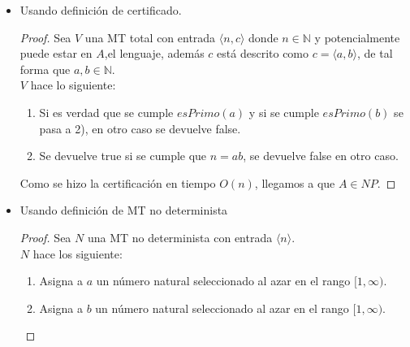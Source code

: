 \documentclass[letterpaper,10pt]{article}
\begin{document}
\begin{enumerate}
\begin{itemize}
         \begin{itemize}
             
         	\item Usando definición de certificado.
            
         		\begin{proof}
         			Sea $V$ una MT total con entrada $\langle n,c \rangle$ donde $n\in \mathbb{N}$ y potencialmente puede estar en $A$,el lenguaje, además $c$ está descrito como $c=\langle a,b \rangle$, de tal forma que $a,b \in \mathbb{N}$.\\
         			
         			$V$ hace lo siguiente:
                    
         			\begin{enumerate}[1)]
                        
         				\item Si es verdad que se cumple $esPrimo(a)$ y si se cumple $esPrimo(b)$ se pasa a 2), en otro caso se devuelve false.
         				
         				\item Se devuelve true si se cumple que $n=ab$, se devuelve false en otro caso.
         			
                    \end{enumerate}
         			
                    Como se hizo la certificación en tiempo $O(n)$, llegamos a
                    que $A\in NP$. 
         		
                \end{proof}
         	
         	\item Usando definición de MT no determinista
            
     			\begin{proof}
     				Sea $N$ una MT no determinista con entrada $\langle n \rangle$.\\
     				
     				$N$ hace los siguiente:
                    
     				\begin{enumerate}[1)]
                        
     					\item Asigna a $a$ un número natural seleccionado al azar en el rango $[1,\infty)$.
     					
     					\item Asigna a $b$ un número natural seleccionado al azar en el rango $[1,\infty)$.
     					

\end{enumerate}
\end{proof}
\end{itemize}
\end{itemize}
\end{enumerate}
\end{document}
